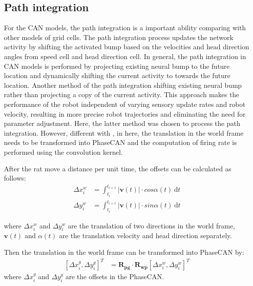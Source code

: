 \documentclass[final,5p,times,twocolumn,authoryear]{elsarticle}
\begin{document}
\subsection{Path integration}

For the CAN models, the path integration is a important ability comparing with other models of grid cells. The path integration process updates the network activity by shifting the activated bump based on the velocities and head direction angles from speed cell\citep{Kropff2015} and head direction cell\citep{Zhang1996,Taube1990}. In general, the path integration in CAN models is performed by projecting existing neural bump to the future location and dynamically shifting the current activity to towards the future location. Another method of the path integration shifting existing neural bump rather than projecting a copy of the current activity. This approach makes the performance of the robot independent of varying sensory update rates and robot velocity, resulting in more precise robot trajectories and eliminating the need for parameter adjustment\citep{Milford2008d}. Here, the latter method was chosen to process the path integration. However, different with \citep{Milford2008d}, in here, the translation in the world frame needs to be transformed into PhaseCAN and the computation of firing rate is performed using the convolution kernel.

After the rat move a distance per unit time, the offsets can be calculated as follows:
\begin{equation}\label{eq:offsets}
	\begin{aligned}
		\Delta x^w_i &= \int_{t_{i}}^{t_{i+1}}|\bm{v}(t)| \cdot cos\alpha(t) \ \text{d}t	\\
		\Delta y^w_i &= \int_{t_{i}}^{t_{i+1}}|\bm{v}(t)| \cdot sin\alpha(t) \ \text{d}t
	\end{aligned}
\end{equation}

where $\Delta x^w_i$ and $\Delta y^w_i$ are the translation of two directions in the world frame, $\bm{v}(t)$ and $\alpha(t)$ are the translation velocity and head direction separately.

Then the translation in the world frame can be transformed into PhaseCAN by:
\begin{align}\label{eq:trans_w2g}	
	[\Delta x^g_i,\Delta y^g_i]^T &= \bm{R_{pg}}\cdot \bm{R_{wp}} [\Delta x^w_i,\Delta y^w_i]^T 
\end{align}
where $\Delta x^g_i$ and $\Delta y^g_i$ are the offsets in the PhaseCAN.
\end{document}
